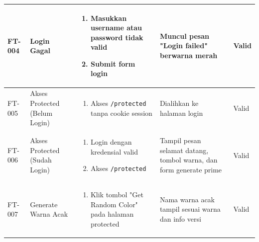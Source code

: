 \begin{table}[H]
\begin{adjustbox}{width=\textwidth}
\begin{tabular}{|p{0.8cm}|p{2.6cm}|p{4.5cm}|p{3.8cm}|p{1.2cm}|}
      FT-004                                                                      & Login Gagal                        &
      \begin{enumerate}[leftmargin=*,noitemsep,topsep=0pt,label=\arabic*.,widest=99]
        \item Masukkan username atau password tidak valid
        \item Submit form login
      \end{enumerate}            &
      Muncul pesan "Login failed" berwarna merah                                  & Valid                                                                                                      \\ \hline

      FT-005                                                                      & Akses Protected (Belum Login)      &
      \begin{enumerate}[leftmargin=*,noitemsep,topsep=0pt,label=\arabic*.,widest=99]
        \item Akses \texttt{/protected} tanpa cookie session
      \end{enumerate}            &
      Dialihkan ke halaman login                                                  & Valid                                                                                                      \\ \hline

      FT-006                                                                      & Akses Protected (Sudah Login)      &
      \begin{enumerate}[leftmargin=*,noitemsep,topsep=0pt,label=\arabic*.,widest=99]
        \item Login dengan kredensial valid
        \item Akses \texttt{/protected}
      \end{enumerate}            &
      Tampil pesan selamat datang, tombol warna, dan form generate prime          & Valid                                                                                                      \\ \hline

      FT-007                                                                      & Generate Warna Acak                &
      \begin{enumerate}[leftmargin=*,noitemsep,topsep=0pt,label=\arabic*.,widest=99]
        \item Klik tombol "Get Random Color" pada halaman protected
      \end{enumerate}            &
      Nama warna acak tampil sesuai warna dan info versi                          & Valid                                                                                                      \\ \hline


\end{tabular}
\end{adjustbox}
\end{table}
